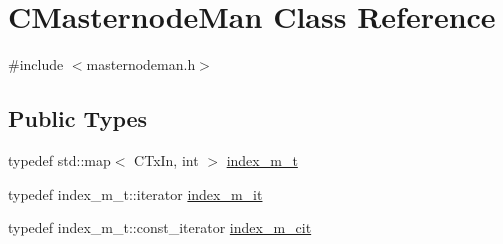 \hypertarget{class_c_masternode_man}{}\section{C\+Masternode\+Man Class Reference}
\label{class_c_masternode_man}


{\ttfamily \#include $<$masternodeman.\+h$>$}

\subsection*{Public Types}
\begin{DoxyCompactItemize}
\item 
typedef std\+::map$<$ C\+Tx\+In, int $>$ \mbox{\hyperlink{class_c_masternode_man_aa8e5e60e3743c6d3e05a1f5d79e889de}{index\+\_\+m\+\_\+t}}
\item 
typedef index\+\_\+m\+\_\+t\+::iterator \mbox{\hyperlink{class_c_masternode_man_a3eb6485ee143b7b95b2765f185b8170e}{index\+\_\+m\+\_\+it}}
\item 
typedef index\+\_\+m\+\_\+t\+::const\+\_\+iterator \mbox{\hyperlink{class_c_masternode_man_aaea1e2a29229c34a6330f36c071b56da}{index\+\_\+m\+\_\+cit}}
\end{DoxyCompactItemize}
